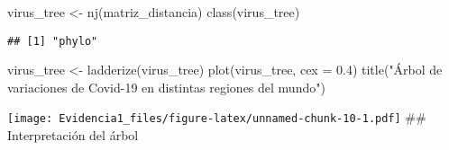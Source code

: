 \documentclass[
]{article}
\newenvironment{Shaded}{\begin{snugshade}}{\end{snugshade}}
\newcommand{\AttributeTok}[1]{\textcolor[rgb]{0.77,0.63,0.00}{#1}}
\newcommand{\FloatTok}[1]{\textcolor[rgb]{0.00,0.00,0.81}{#1}}
\newcommand{\FunctionTok}[1]{\textcolor[rgb]{0.00,0.00,0.00}{#1}}
\newcommand{\NormalTok}[1]{#1}
\newcommand{\OtherTok}[1]{\textcolor[rgb]{0.56,0.35,0.01}{#1}}
\newcommand{\StringTok}[1]{\textcolor[rgb]{0.31,0.60,0.02}{#1}}
\begin{document}
\begin{Shaded}
\begin{Highlighting}[]
\NormalTok{virus\_tree }\OtherTok{\textless{}{-}} \FunctionTok{nj}\NormalTok{(matriz\_distancia)}
\FunctionTok{class}\NormalTok{(virus\_tree) }
\end{Highlighting}
\end{Shaded}

\begin{verbatim}
## [1] "phylo"
\end{verbatim}

\begin{Shaded}
\begin{Highlighting}[]
\NormalTok{virus\_tree }\OtherTok{\textless{}{-}} \FunctionTok{ladderize}\NormalTok{(virus\_tree)}
\FunctionTok{plot}\NormalTok{(virus\_tree, }\AttributeTok{cex =} \FloatTok{0.4}\NormalTok{)}
\FunctionTok{title}\NormalTok{(}\StringTok{"Árbol de variaciones de Covid{-}19 en distintas regiones del mundo"}\NormalTok{)}
\end{Highlighting}
\end{Shaded}

\texttt{[image: Evidencia1\_files/figure-latex/unnamed-chunk-10-1.pdf]}
\#\# Interpretación del árbol
\end{document}
